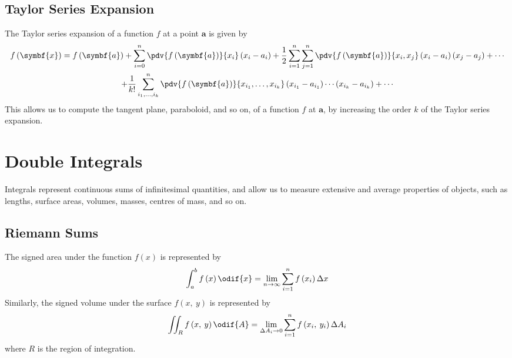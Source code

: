 \documentclass{article}
\begin{document}
\subsection{Taylor Series Expansion}
The Taylor series expansion of a function \(f\) at a point
\(\symbf{a}\) is given by
\begin{multline*}
    f\left( \symbf{x} \right) = f\left( \symbf{a} \right) + \sum_{i = 0}^n \pdv{f\left( \symbf{a} \right)}{x_i} \left( x_i - a_i \right) + \frac{1}{2} \sum_{i = 1}^n \sum_{j = 1}^n \pdv{f\left( \symbf{a} \right)}{x_i,x_j} \left( x_i - a_i \right) \left( x_j - a_j \right) + \cdots \\
    + \frac{1}{k!} \sum_{i_1, \ldots, i_k}^{n} \pdv{f\left( \symbf{a} \right)}{x_{i_1}, \ldots, x_{i_k}} \left( x_{i_1} - a_{i_1} \right) \cdots \left( x_{i_k} - a_{i_k} \right) + \cdots
\end{multline*}
This allows us to compute the tangent plane, paraboloid, and so on, of
a function \(f\) at \(\symbf{a}\), by increasing the order \(k\) of the
Taylor series expansion.
\section{Double Integrals}
Integrals represent continuous sums of infinitesimal quantities, and
allow us to measure extensive and average properties of objects, such
as lengths, surface areas, volumes, masses, centres of mass, and so on.
\subsection{Riemann Sums}
The signed area under the function \(f\left( x \right)\) is represented
by
\begin{equation*}
    \int_a^b f\left( x \right) \odif{x} = \lim_{n \to \infty} \sum_{i = 1}^n f\left( x_i \right) \Delta x
\end{equation*}
Similarly, the signed volume under the surface \(f\left( x,\: y \right)\)
is represented by
\begin{equation*}
    \iint_R f\left( x,\: y \right) \odif{A} = \lim_{\Delta A_i \to 0} \sum_{i = 1}^n f\left( x_i,\: y_i \right) \Delta A_i
\end{equation*}
where \(R\) is the region of integration.
\end{document}

